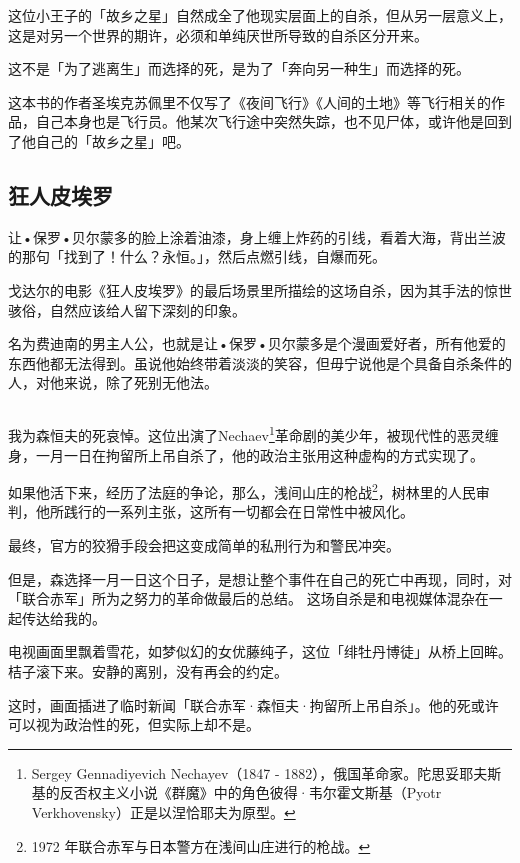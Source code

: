 \documentclass[UTF8]{ctexart}
\begin{document}
这位小王子的「故乡之星」自然成全了他现实层面上的自杀，但从另一层意义上，这是对另一个世界的期许，必须和单纯厌世所导致的自杀区分开来。

这不是「为了逃离生」而选择的死，是为了「奔向另一种生」而选择的死。

这本书的作者圣埃克苏佩里不仅写了《夜间飞行》《人间的土地》等飞行相关的作品，自己本身也是飞行员。他某次飞行途中突然失踪，也不见尸体，或许他是回到了他自己的「故乡之星」吧。

\subsection{狂人皮埃罗}

让•保罗•贝尔蒙多的脸上涂着油漆，身上缠上炸药的引线，看着大海，背出兰波的那句「找到了！什么？永恒。」，然后点燃引线，自爆而死。

戈达尔的电影《狂人皮埃罗》的最后场景里所描绘的这场自杀，因为其手法的惊世骇俗，自然应该给人留下深刻的印象。

名为费迪南的男主人公，也就是让•保罗•贝尔蒙多是个漫画爱好者，所有他爱的东西他都无法得到。虽说他始终带着淡淡的笑容，但毋宁说他是个具备自杀条件的人，对他来说，除了死别无他法。

\subsection{}

我为森恒夫的死哀悼。这位出演了Nechaev\footnote{Sergey Gennadiyevich Nechayev（1847 - 1882），俄国革命家。陀思妥耶夫斯基的反否权主义小说《群魔》中的角色彼得·韦尔霍文斯基（Pyotr Verkhovensky）正是以涅恰耶夫为原型。}革命剧的美少年，被现代性的恶灵缠身，一月一日在拘留所上吊自杀了，他的政治主张用这种虚构的方式实现了。

如果他活下来，经历了法庭的争论，那么，浅间山庄的枪战\footnote{1972 年联合赤军与日本警方在浅间山庄进行的枪战。}，树林里的人民审判，他所践行的一系列主张，这所有一切都会在日常性中被风化。

最终，官方的狡猾手段会把这变成简单的私刑行为和警民冲突。

但是，森选择一月一日这个日子，是想让整个事件在自己的死亡中再现，同时，对「联合赤军」所为之努力的革命做最后的总结。
这场自杀是和电视媒体混杂在一起传达给我的。

电视画面里飘着雪花，如梦似幻的女优藤纯子，这位「绯牡丹博徒」从桥上回眸。桔子滚下来。安静的离别，没有再会的约定。

这时，画面插进了临时新闻「联合赤军·森恒夫·拘留所上吊自杀」。他的死或许可以视为政治性的死，但实际上却不是。
\end{document}
